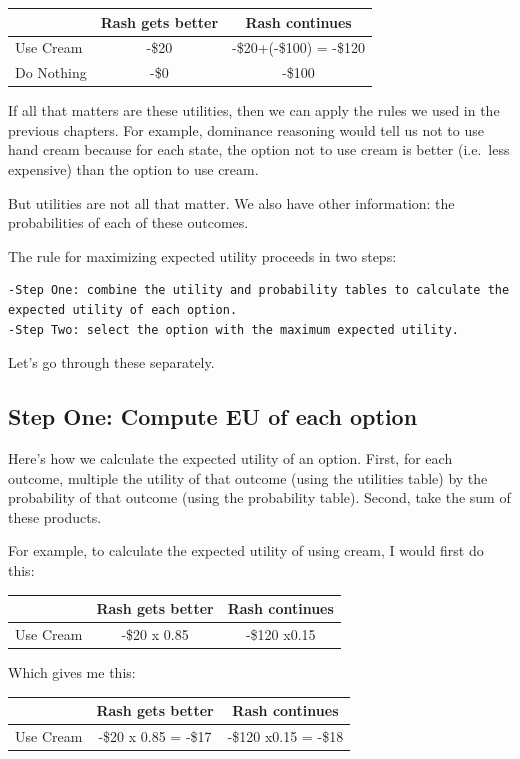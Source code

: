 \documentclass[]{tufte-book}
\begin{document}
\begin{longtable}[]{@{}lcc@{}}
\toprule
& Rash gets better & Rash continues\tabularnewline
\midrule
\endhead
Use Cream & -\$20 & -\$20+(-\$100) = -\$120\tabularnewline
Do Nothing & -\$0 & -\$100\tabularnewline
\bottomrule
\end{longtable}

If all that matters are these utilities, then we can apply the rules we used in the previous chapters. For example, dominance reasoning would tell us not to use hand cream because for each state, the option not to use cream is better (i.e.~less expensive) than the option to use cream.

But utilities are not all that matter. We also have other information: the probabilities of each of these outcomes.

The rule for maximizing expected utility proceeds in two steps:

\begin{verbatim}
-Step One: combine the utility and probability tables to calculate the expected utility of each option. 
-Step Two: select the option with the maximum expected utility. 
\end{verbatim}

Let's go through these separately.

\hypertarget{step-one-compute-eu-of-each-option}{%
\subsection{Step One: Compute EU of each option}\label{step-one-compute-eu-of-each-option}}

Here's how we calculate the expected utility of an option. First, for each outcome, multiple the utility of that outcome (using the utilities table) by the probability of that outcome (using the probability table). Second, take the sum of these products.

For example, to calculate the expected utility of using cream, I would first do this:

\begin{longtable}[]{@{}lcc@{}}
\toprule
& Rash gets better & Rash continues\tabularnewline
\midrule
\endhead
Use Cream & -\$20 x 0.85 & -\$120 x0.15\tabularnewline
\bottomrule
\end{longtable}

Which gives me this:

\begin{longtable}[]{@{}lcc@{}}
\toprule
& Rash gets better & Rash continues\tabularnewline
\midrule
\endhead
Use Cream & -\$20 x 0.85 = -\$17 & -\$120 x0.15 = -\$18\tabularnewline
\bottomrule
\end{longtable}
\end{document}
